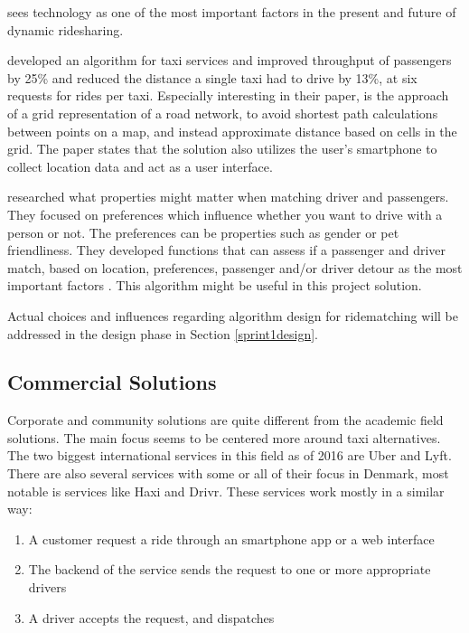 \citet{doi:10.1080/01441647.2011.621557, amey2011real} sees technology as one of the most important factors in the present and future of dynamic ridesharing.

\citet{ShuoMa2013} developed an algorithm for taxi services and improved throughput of passengers by 25\% and reduced the distance a single taxi had to drive by 13\%, at six requests for rides per taxi. %
Especially interesting in their paper, is the approach of a grid representation of a road network, to avoid shortest path calculations between points on a map, and instead approximate distance based on cells in the grid.
The paper states that the solution also utilizes the user's smartphone to collect location data and act as a user interface.

\citet{ghoseiri2011real} researched what properties might matter when matching driver and passengers.
They focused on preferences which influence whether you want to drive with a person or not. The preferences can be properties such as gender or pet friendliness.
They developed functions that can assess if a passenger and driver match, based on location, preferences, passenger and/or driver detour as the most important factors \cite{ghoseiri2011real}.
This algorithm might be useful in this project solution.

Actual choices and influences regarding algorithm design for ridematching will be addressed in the design phase in Section \ref{sprint1design}.

\subsection{Commercial Solutions}
Corporate and community solutions are quite different from the academic field solutions.
The main focus seems to be centered more around taxi alternatives.
The two biggest international services in this field as of 2016 are Uber and Lyft.
There are also several services with some or all of their focus in Denmark, most notable is services like Haxi and Drivr.
These services work mostly in a similar way: 

\begin{enumerate}
	\item A customer request a ride through an smartphone app or a web interface
	\item The backend of the service sends the request to one or more appropriate drivers
	\item A driver accepts the request, and dispatches
\end{enumerate}

